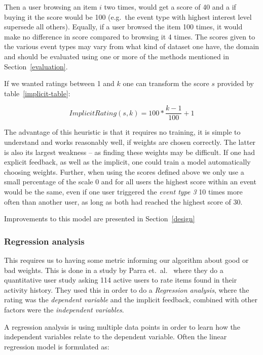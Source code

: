 Then a user browsing an item $i$ two times, would get a score of 40 and a if
buying it the score would be 100 (e.g.\ the event type with highest interest
level supersede all others). Equally, if a user browsed the item 100 times, it
would make no difference in score compared to browsing it 4 times. The scores
given to the various event types may vary from what kind of dataset one have,
the domain and should be evaluated using one or more of the methods mentioned
in Section~\ref{evaluation}.

If we wanted ratings between 1 and $k$ one can transform the score $s$ provided
by table~\ref{implicit-table}:

\begin{equation}
  ImplicitRating(s, k) = 100 * \frac{k-1}{100} + 1
\end{equation}

The advantage of this heuristic is that it requires no training, it is simple
to understand and works reasonably well, if weights are chosen correctly.
The latter is also its largest weakness – as finding these weights may be
difficult. If one had explicit feedback, as well as the implicit, one could
train a model automatically choosing weights. Further, when using the scores
defined above we only use a small percentage of the scale 0 and for all
users the highest score within an event would be the same, even if one user
triggered the \textit{event type 3} 10 times more often than another user, as
long as both had reached the highest score of 30.

Improvements to this model are presented in Section~\ref{design}

\subsubsection{Regression analysis}

This requires us to having some metric informing our algorithm about good or
bad weights. This is done in a study by Parra et.\ al.~\cite{parra2011walk}
where they do a quantitative user study asking 114 active users to rate items
found in their activity history. They used this in order to do
a \textit{Regression analysis}, where the rating was the \textit{dependent
variable} and the implicit feedback, combined with other factors were the
\textit{independent variables}.

A regression analysis is using multiple data points in order to learn how the
independent variables relate to the dependent variable. Often the linear
regression model is formulated as:

